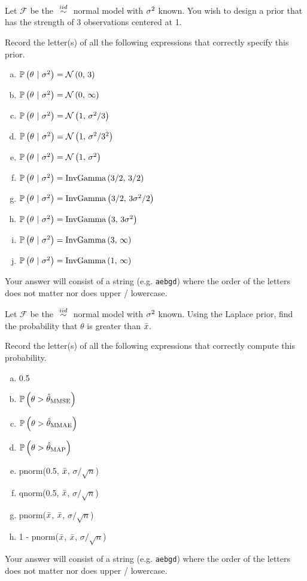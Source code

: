 \documentclass[12pt]{article}
\newcommand{\instr}{Your answer will consist of a string (e.g. \texttt{aebgd}) where the order of the letters does not matter nor does upper / lowercase.}
\begin{document}
\problem [8min] Let $\mathcal{F}$ be the $\iid$ normal model with $\sigma^2$ known. You wish to design a prior that has the strength of 3 observations centered at 1.
\benum

 Record the letter(s) of all the following expressions that correctly specify this prior.


\begin{enumerate}[(a)]
\item $\mathbb{P}\left(\theta~|~\sigma^2\right) = \mathcal{N}\left(0,\,3\right)$
\item $\mathbb{P}\left(\theta~|~\sigma^2\right) = \mathcal{N}\left(0,\,\infty\right)$
\item $\mathbb{P}\left(\theta~|~\sigma^2\right) = \mathcal{N}\left(1,\,\sigma^2 / 3\right)$
\item $\mathbb{P}\left(\theta~|~\sigma^2\right) = \mathcal{N}\left(1,\,\sigma^2 / 3^2\right)$
\item $\mathbb{P}\left(\theta~|~\sigma^2\right) = \mathcal{N}\left(1,\,\sigma^2\right)$
\item $\mathbb{P}\left(\theta~|~\sigma^2\right) = \text{InvGamma}\left(3/2,\,3/2\right)$
\item $\mathbb{P}\left(\theta~|~\sigma^2\right) = \text{InvGamma}\left(3/2,\,3\sigma^2/2\right)$
\item $\mathbb{P}\left(\theta~|~\sigma^2\right) = \text{InvGamma}\left(3,\,3\sigma^2\right)$
\item $\mathbb{P}\left(\theta~|~\sigma^2\right) = \text{InvGamma}\left(3,\,\infty\right)$
\item $\mathbb{P}\left(\theta~|~\sigma^2\right) = \text{InvGamma}\left(1,\,\infty\right)$
\end{enumerate}
\eenum\instr\pagebreak



\problem [8min] Let $\mathcal{F}$ be the $\iid$ normal model with $\sigma^2$ known. Using the Laplace prior, find the probability that $\theta$ is greater than $\bar{x}$.
\benum

 Record the letter(s) of all the following expressions that correctly compute this probability. 


\begin{enumerate}[(a)]
\item 0.5
\item $\mathbb{P}\left(\theta > \hat{\theta}_{\mathrm{MMSE}}\right)$
\item $\mathbb{P}\left(\theta > \hat{\theta}_{\mathrm{MMAE}}\right)$
\item $\mathbb{P}\left(\theta > \hat{\theta}_{\mathrm{MAP}}\right)$
\item pnorm(0.5, $\bar{x}$, $\sigma / \sqrt{n}$)
\item qnorm(0.5, $\bar{x}$, $\sigma / \sqrt{n}$)
\item pnorm($\bar{x}$, $\bar{x}$, $\sigma / \sqrt{n}$)
\item 1 - pnorm($\bar{x}$, $\bar{x}$, $\sigma / \sqrt{n}$)
\end{enumerate}
\eenum\instr\pagebreak
\end{document}
